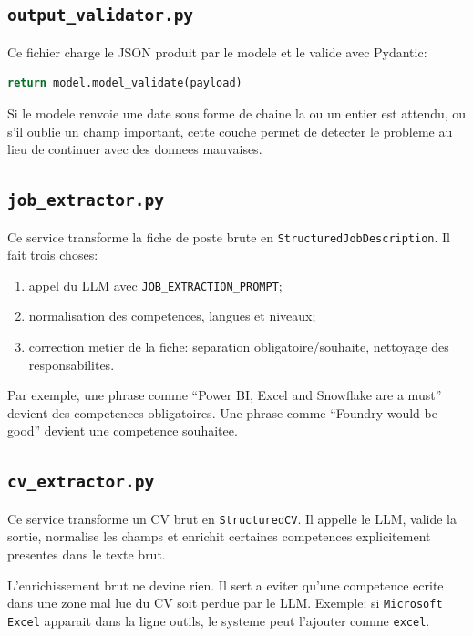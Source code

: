 \documentclass[12pt,a4paper]{article}
\begin{document}
\subsection{\texttt{output\_validator.py}}

Ce fichier charge le JSON produit par le modele et le valide avec Pydantic:

\begin{lstlisting}[style=smartcode,language=Python]
return model.model_validate(payload)
\end{lstlisting}

Si le modele renvoie une date sous forme de chaine la ou un entier est attendu, ou s'il oublie un champ important, cette couche permet de detecter le probleme au lieu de continuer avec des donnees mauvaises.

\subsection{\texttt{job\_extractor.py}}

Ce service transforme la fiche de poste brute en \texttt{StructuredJobDescription}. Il fait trois choses:

\begin{enumerate}
  \item appel du LLM avec \texttt{JOB\_EXTRACTION\_PROMPT};
  \item normalisation des competences, langues et niveaux;
  \item correction metier de la fiche: separation obligatoire/souhaite, nettoyage des responsabilites.
\end{enumerate}

Par exemple, une phrase comme ``Power BI, Excel and Snowflake are a must'' devient des competences obligatoires. Une phrase comme ``Foundry would be good'' devient une competence souhaitee.

\subsection{\texttt{cv\_extractor.py}}

Ce service transforme un CV brut en \texttt{StructuredCV}. Il appelle le LLM, valide la sortie, normalise les champs et enrichit certaines competences explicitement presentes dans le texte brut.

L'enrichissement brut ne devine rien. Il sert a eviter qu'une competence ecrite dans une zone mal lue du CV soit perdue par le LLM. Exemple: si \texttt{Microsoft Excel} apparait dans la ligne outils, le systeme peut l'ajouter comme \texttt{excel}. 
\end{document}
